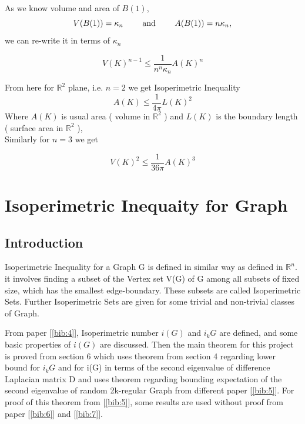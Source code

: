 \documentclass[oneside]{book}
\begin{document}
	As we know volume and area of $B(1)$, 
	$$V(B(1))=\kappa_{n} \text{  \quad \quad and \quad \quad   } A(B(1))=n \kappa_{n},$$
	we can re-write it  in terms of $\kappa_{n}$
	
	\[
	V(K)^{n-1} \leq \frac{1}{n^{n} \kappa_{n}} A(K)^{n}
	\]
	\hfill \break
	
	From here for $\mathbb{R}^{2}$ plane, i.e. $n=2$ we get Isoperimetric Inequality  
	\[
	A(K) \leq \frac{1}{4 \pi} L(K)^{2}
	\]
	Where  $A(K)$ is usual  area ( volume in $\mathbb{R}^{2}$ ) and $L(K)$ is the boundary length \newline  ( surface area in $\mathbb{R}^{2}$ ), \\
	
	Similarly  for $n=3$
	we get
	
	\[
	V(K)^{2} \leq \frac{1}{36 \pi} A(K)^{3}
	\]
	
	
	



	
	
	
	
	
	
	\chapter{Isoperimetric Inequaity for Graph}
	\section{Introduction}
	\label{s:5}
	
	Isoperimetric Inequality for a Graph G is defined in similar way as defined in $\mathbb{R}^n$. it involves finding a subset of the Vertex set V(G) of G among all subsets of fixed size, which has the smallest edge-boundary. These subsets are called Isoperimetric Sets. Further  Isoperimetric Sets are given for some trivial and non-trivial classes of Graph. \par 
	From paper [\ref{bib:4}], Isoperimetric number $i(G)$ and $i_k{G}$ are defined, and some basic properties of $i(G)$  are discussed. Then the main theorem for this project is proved from section 6 which uses theorem from section 4 regarding lower bound for $i_k{G}$ and for i(G) in terms of the second eigenvalue of difference Laplacian matrix D and uses theorem regarding bounding expectation of the second eigenvalue of random 2k-regular Graph from different paper [\ref{bib:5}]. For proof of this theorem from [\ref{bib:5}], some results are used without proof from paper [\ref{bib:6}] and [\ref{bib:7}].
	
\end{document}
